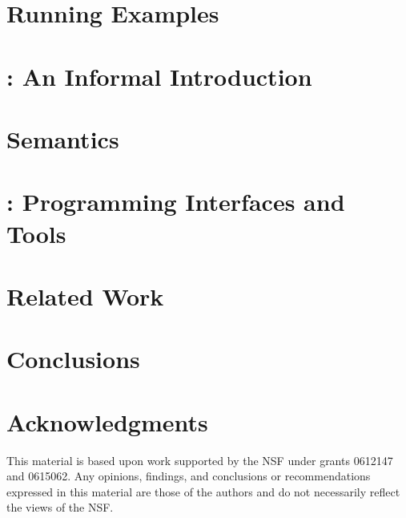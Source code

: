 \documentclass[nocopyrightspace]{sigplanconf}
\begin{document}
\section{Running Examples}
\label{sec:examples}


\section{\padsd{}: An Informal Introduction}
\label{sec:informal}


\section{\padsd{} Semantics}
\label{sec:semantics}


\section{\padsd{}:  Programming Interfaces and Tools}
\label{sec:programming}

\section{Related Work}
\label{sec:related}


\section{Conclusions}
\label{sec:conclusions}

\section*{Acknowledgments}

This material is based upon work 
supported by the NSF
   under grants 0612147 and 0615062.
Any opinions, findings, and conclusions or recommendations
   expressed in this material are those of the authors and do not
   necessarily reflect the views of the NSF.



\end{document}
